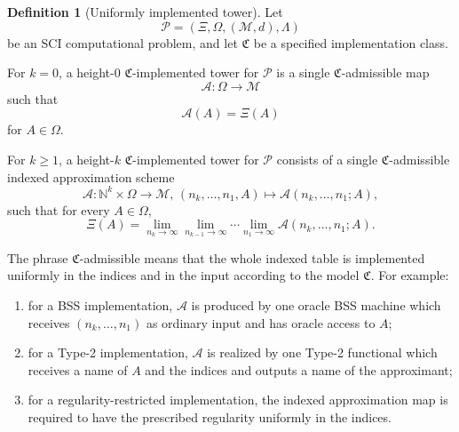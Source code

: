 \documentclass{lmcs} %
\theoremstyle{plain}
\theoremstyle{plain}
\theoremstyle{definition}
\newtheorem{definition}[theorem]{Definition}
\theoremstyle{remark}
\theoremstyle{definition}
\theoremstyle{remark}
\numberwithin{equation}{section}
\begin{document}
\begin{definition}[Uniformly implemented tower]\label{def:uniformly-implemented-tower}
Let
\[
        \mathcal P=(\Xi,\Omega,(\mathcal M,d),\Lambda)
\]
be an SCI computational problem, and let \(\mathfrak C\) be a specified implementation class.

For \(k=0\), a height-\(0\) \(\mathfrak C\)-implemented tower for \(\mathcal P\) is a single \(\mathfrak C\)-admissible map
\[
        \mathcal A:\Omega\to \mathcal M
\]
such that
\[
        \mathcal A(A)=\Xi(A)
\]
for $A\in\Omega$.

For \(k\ge1\), a height-\(k\) \(\mathfrak C\)-implemented tower for \(\mathcal P\) consists of a single \(\mathfrak C\)-admissible indexed approximation scheme
\[
        \mathcal A:\mathbb N^k\times\Omega\to \mathcal M, \, (n_k,\ldots,n_1,A)\mapsto
        \mathcal A(n_k,\ldots,n_1;A),
\]
such that for every \(A\in\Omega\),
\[
        \Xi(A) =
        \lim_{n_k\to\infty}
        \lim_{n_{k-1}\to\infty}
        \cdots
        \lim_{n_1\to\infty}
        \mathcal A(n_k,\ldots,n_1;A).
\]

The phrase \(\mathfrak C\)-admissible means that the whole indexed table is implemented
uniformly in the indices and in the input according to the model \(\mathfrak C\).
For example:
\begin{enumerate}
\item for a BSS implementation, \(\mathcal A\) is produced by one oracle BSS machine
which receives \((n_k,\ldots,n_1)\) as ordinary input and has oracle access to \(A\);
\item for a Type-2 implementation, \(\mathcal A\) is realized by one Type-2 functional
which receives a name of \(A\) and the indices and outputs a name of the approximant;
\item for a regularity-restricted implementation, the indexed approximation map is
required to have the prescribed regularity uniformly in the indices.
\end{enumerate}
\end{definition}
\end{document}
